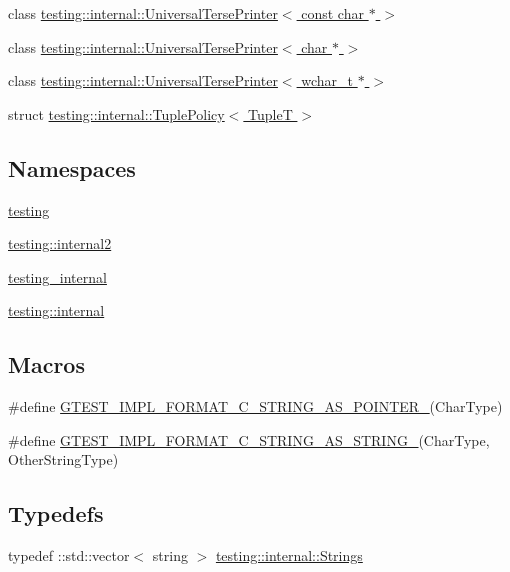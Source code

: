 \begin{DoxyCompactItemize}
\item 
class \hyperlink{classtesting_1_1internal_1_1UniversalTersePrinter_3_01const_01char_01_5_01_4}{testing\+::internal\+::\+Universal\+Terse\+Printer$<$ const char $\ast$ $>$}
\item 
class \hyperlink{classtesting_1_1internal_1_1UniversalTersePrinter_3_01char_01_5_01_4}{testing\+::internal\+::\+Universal\+Terse\+Printer$<$ char $\ast$ $>$}
\item 
class \hyperlink{classtesting_1_1internal_1_1UniversalTersePrinter_3_01wchar__t_01_5_01_4}{testing\+::internal\+::\+Universal\+Terse\+Printer$<$ wchar\+\_\+t $\ast$ $>$}
\item 
struct \hyperlink{structtesting_1_1internal_1_1TuplePolicy}{testing\+::internal\+::\+Tuple\+Policy$<$ Tuple\+T $>$}
\end{DoxyCompactItemize}
\subsection*{Namespaces}
\begin{DoxyCompactItemize}
\item 
 \hyperlink{namespacetesting}{testing}
\item 
 \hyperlink{namespacetesting_1_1internal2}{testing\+::internal2}
\item 
 \hyperlink{namespacetesting__internal}{testing\+\_\+internal}
\item 
 \hyperlink{namespacetesting_1_1internal}{testing\+::internal}
\end{DoxyCompactItemize}
\subsection*{Macros}
\begin{DoxyCompactItemize}
\item 
\#define \hyperlink{gtest-printers_8h_a79d4724b4bc2a1dd8493c366b5ca626a}{G\+T\+E\+S\+T\+\_\+\+I\+M\+P\+L\+\_\+\+F\+O\+R\+M\+A\+T\+\_\+\+C\+\_\+\+S\+T\+R\+I\+N\+G\+\_\+\+A\+S\+\_\+\+P\+O\+I\+N\+T\+E\+R\+\_\+}(Char\+Type)
\item 
\#define \hyperlink{gtest-printers_8h_ad6102ed2a0571d5196e606a061c16a10}{G\+T\+E\+S\+T\+\_\+\+I\+M\+P\+L\+\_\+\+F\+O\+R\+M\+A\+T\+\_\+\+C\+\_\+\+S\+T\+R\+I\+N\+G\+\_\+\+A\+S\+\_\+\+S\+T\+R\+I\+N\+G\+\_\+}(Char\+Type,  Other\+String\+Type)
\end{DoxyCompactItemize}
\subsection*{Typedefs}
\begin{DoxyCompactItemize}
\item 
typedef \+::std\+::vector$<$ string $>$ \hyperlink{namespacetesting_1_1internal_a7706b17f05f4b49e351b052ae4e05073}{testing\+::internal\+::\+Strings}
\end{DoxyCompactItemize}
